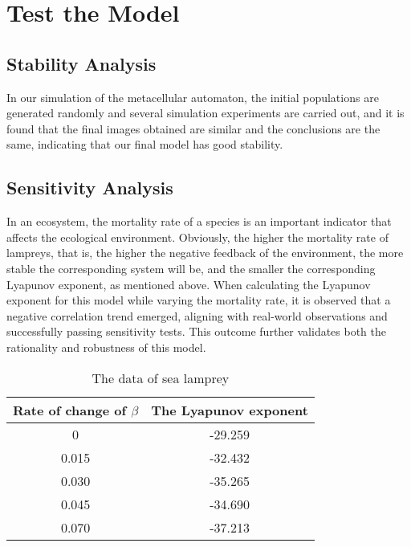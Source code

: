 \documentclass[12pt]{article}  %
\begin{document}
\section{Test the Model}

\subsection{Stability Analysis}
In our simulation of the metacellular automaton, the initial populations are generated randomly and several simulation experiments are carried out, and it is found that the final images obtained are similar and the conclusions are the same, indicating that our final model has good stability.

\subsection{Sensitivity Analysis}
In an ecosystem, the mortality rate of a species is an important indicator that affects the ecological environment. Obviously, the higher the mortality rate of lampreys, that is, the higher the negative feedback of the environment, the more stable the corresponding system will be, and the smaller the corresponding Lyapunov exponent, as mentioned above. When calculating the Lyapunov exponent for this model while varying the mortality rate, it is observed that a negative correlation trend emerged, aligning with real-world observations and successfully passing sensitivity tests. This outcome further validates both the rationality and robustness of this model.
\begin{table}[!htbp]
	\begin{center}
		\begin{threeparttable}
			\caption{The data of sea lamprey}
			\begin{tabular}{cc}
				\toprule
				\multicolumn{1}{m{6cm}}{\centering Rate of change of $\beta$}
				&\multicolumn{1}{m{6cm}}{\centering The Lyapunov exponent} \\
				\midrule
0 & -29.259  \\ 
0.015 & -32.432 \\ 
0.030 & -35.265  \\ 
0.045 & -34.690  \\ 
0.070 & -37.213  \\ 
				
				\bottomrule
			\end{tabular}
			\small
		\end{threeparttable}
	\end{center}
\end{table}
\end{document}
